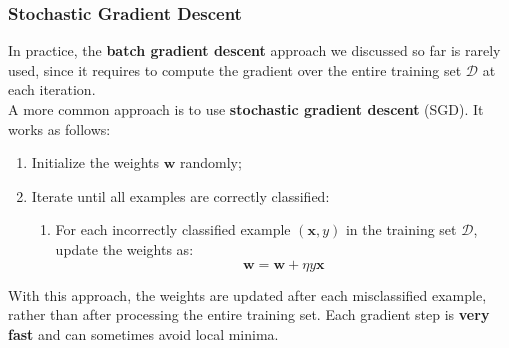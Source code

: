 \subsubsection{Stochastic Gradient Descent}
In practice, the \textbf{batch gradient descent} approach we discussed so far is rarely used, 
since it requires to compute the gradient over the entire training set $\mathcal{D}$ at each iteration.
\\A more common approach is to use \textbf{stochastic gradient descent} (SGD). It works as follows:
\begin{enumerate}
    \item Initialize the weights $\boldsymbol{w}$ randomly;
    \item Iterate until all examples are correctly classified:
    \begin{enumerate}
        \item For each incorrectly classified example $(\boldsymbol{x}, y)$ in the training set $\mathcal{D}$, update the weights as:
        \begin{equation}
            \boldsymbol{w} = \boldsymbol{w} + \eta y \boldsymbol{x}
        \end{equation}
    \end{enumerate}
\end{enumerate} 
With this approach, the weights are updated after each misclassified example, 
rather than after processing the entire training set.
Each gradient step is \textbf{very fast} and can sometimes avoid local minima.

